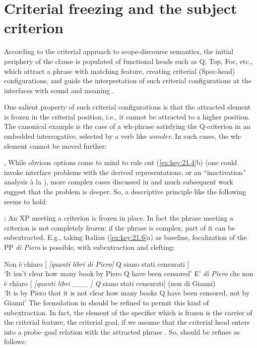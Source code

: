 \documentclass[output=paper]{langsci/langscibook}
\begin{document}
\section{Criterial freezing and the subject criterion}

According to the criterial approach  to scope-discourse semantics, the initial
periphery of the clause is populated of functional heads such as Q, Top, Foc,
etc., which attract a phrase with matching feature, creating criterial
(Spec-head) configurations, and guide the interpretation of such criterial
configurations at the interfaces with sound and meaning \citep{Rizzi1997}.

One salient property of such criterial configurations is that the attracted
element is frozen in the criterial position, i.e., it cannot be attracted to a
higher position. The canonical example is the case of a wh-phrase satisfying
the Q-criterion in an embedded interrogative, selected by a verb like
\emph{wonder}. In such cases, the wh-element cannot be moved further:

\ea%
    \label{ex:key:21.4} \textcite{LasnikSaito1992}, \textcite{Boskovic2008}
    \z
\z
%
While obvious options come to mind to rule out (\ref{ex:key:21.4}b) (one could
invoke interface problems with the derived representations, or an
“inactivation” analysis à la \citealt{Boskovic2008}), more complex cases
discussed in \textcite{rizzicriterial,Rizzi2011} and much subsequent work suggest that the
problem is deeper. So, a descriptive principle like the following seems to
hold:

\ea%
    \label{ex:key:21.5}
    : An XP meeting a criterion is frozen in place.
\z
%
In fact the phrase meeting a criterion is not completely frozen: if the phrase
is complex, part of it can be subextracted. E.g., taking Italian
(\ref{ex:key:21.6}a) as baseline, focalization of the PP \emph{di Piero} is
possible, with subextraction and clefting:

\ea%
    \label{ex:key:21.6}
    \ea Non è chiaro   [ \emph{[quanti libri di Piero]} Q siano stati censurati ]\\
        ‘It isn’t clear       how many book by Piero Q have been censored’
    \ex E’ \emph{di Piero} che non è chiaro [ \emph{[quanti libri \_\_\_ ] Q}  siano stati censurati] (non di Gianni)\\
        ‘It is by Piero that it is not clear how many books Q have been censored, not by Gianni’
    \z
\z
%
The formulation in  should be refined to permit this kind of
subextraction. In fact, the element of the specifier which is frozen is the
carrier of the criterial feature, the criterial goal, if we assume that the
criterial head enters into a probe--goal relation with the attracted phrase
\citep{Chomsky2000}. So,  should be refines as follows:
\end{document}
